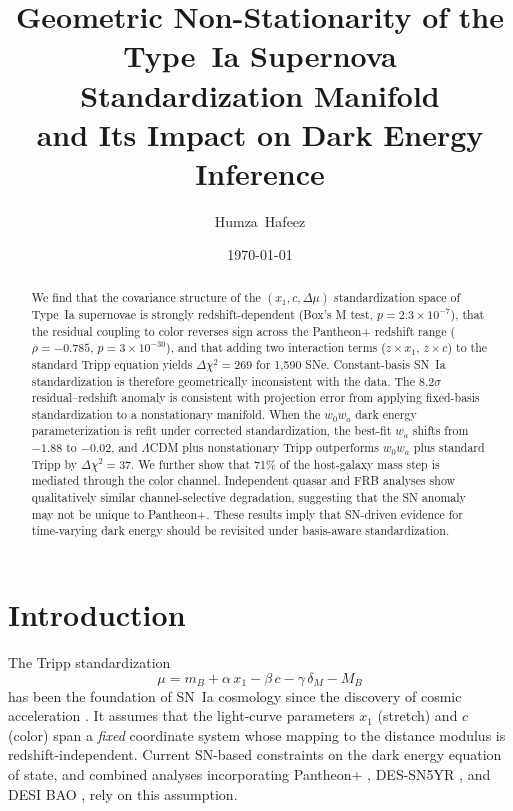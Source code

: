\documentclass[twocolumn,showpacs,preprintnumbers,amsmath,amssymb,prl]{revtex4-2}
\begin{document}
\title{Geometric Non-Stationarity of the Type~Ia Supernova Standardization Manifold\\and Its Impact on Dark Energy Inference}

\author{Humza~Hafeez}

\date{\today}

\begin{abstract}
We find that the covariance structure of the $(x_1, c, \Delta\mu)$ standardization space of Type~Ia supernovae is strongly redshift-dependent (Box's M test, $p = 2.3 \times 10^{-7}$), that the residual coupling to color reverses sign across the Pantheon+ redshift range ($\rho = -0.785$, $p = 3 \times 10^{-30}$), and that adding two interaction terms ($z \times x_1$, $z \times c$) to the standard Tripp equation yields $\Delta\chi^2 = 269$ for 1{,}590 SNe. Constant-basis SN~Ia standardization is therefore geometrically inconsistent with the data. The $8.2\sigma$ residual--redshift anomaly is consistent with projection error from applying fixed-basis standardization to a nonstationary manifold. When the $w_0 w_a$ dark energy parameterization is refit under corrected standardization, the best-fit $w_a$ shifts from $-1.88$ to $-0.02$, and $\Lambda$CDM plus nonstationary Tripp outperforms $w_0 w_a$ plus standard Tripp by $\Delta\chi^2 = 37$. We further show that 71\% of the host-galaxy mass step is mediated through the color channel. Independent quasar and FRB analyses show qualitatively similar channel-selective degradation, suggesting that the SN anomaly may not be unique to Pantheon+. These results imply that SN-driven evidence for time-varying dark energy should be revisited under basis-aware standardization.
\end{abstract}

\maketitle

\section{Introduction}
\label{sec:intro}

The Tripp standardization \citep{Tripp1998}
\begin{equation}
\label{eq:tripp}
\mu = m_B + \alpha\, x_1 - \beta\, c - \gamma\,\delta_M - M_B
\end{equation}
has been the foundation of SN~Ia cosmology since the discovery of cosmic acceleration \citep{Riess1998,Perlmutter1999}. It assumes that the light-curve parameters $x_1$ (stretch) and $c$ (color) span a \emph{fixed} coordinate system whose mapping to the distance modulus is redshift-independent. Current SN-based constraints on the dark energy equation of state, and combined analyses incorporating Pantheon+ \citep{Scolnic2022,Brout2022}, DES-SN5YR \citep{DES2024}, and DESI BAO \citep{DESI2024}, rely on this assumption.
\end{document}
